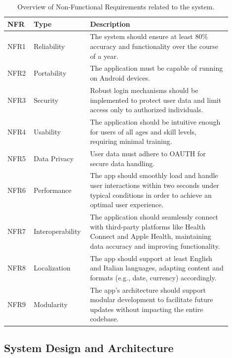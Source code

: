 \begin{table}[h!]
    \setstretch{\myspacing}
    \centering
    \begin{tabular}{|>{\raggedright\arraybackslash}p{0.1\linewidth}|>{\raggedright\arraybackslash}p{0.2\linewidth}|>{\raggedright\arraybackslash}p{0.6\linewidth}|}
        \hline
        \textbf{NFR} & \textbf{Type} & \textbf{Description} \\
        \hline
        NFR1 & Reliability & The system should ensure at least 80\% accuracy and functionality over the course of a year. \\
        \hline
        NFR2 & Portability & The application must be capable of running on Android devices. \\
        \hline
        NFR3 & Security & Robust login mechanisms should be implemented to protect user data and limit access only to authorized individuals. \\
        \hline
        NFR4 & Usability & The application should be intuitive enough for users of all ages and skill levels, requiring minimal training. \\
        \hline
        NFR5 & Data Privacy & User data must adhere to OAUTH for secure data handling. \\
        \hline
        NFR6 & Performance & The app should smoothly load and handle user interactions within two seconds under typical conditions in order to achieve an optimal user experience. \\
        \hline
        NFR7 & Interoperability & The application should seamlessly connect with third-party platforms like Health Connect and Apple Health, maintaining data accuracy and improving functionality. \\
        \hline
        NFR8 & Localization & The app should support at least English and Italian languages, adapting content and formats (e.g., date, currency) accordingly. \\
        \hline
        NFR9 & Modularity & The app's architecture should support modular development to facilitate future updates without impacting the entire codebase. \\
        \hline
    \end{tabular}
    \caption{Overview of Non-Functional Requirements related to the system.}
    \label{tab:nfr}
\end{table}
\newpage
\subsection{System Design and Architecture}
